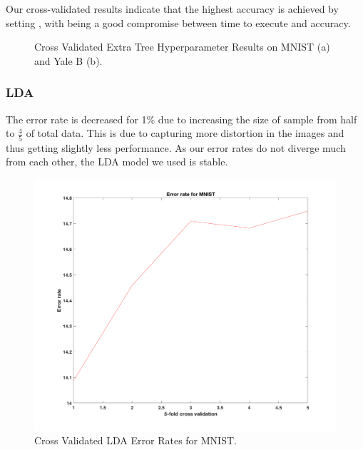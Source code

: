 Our cross-validated results indicate that the highest accuracy is achieved by setting , with  being a good compromise between time to execute and accuracy.
%
\begin{figure}[H]
    \centering
    \caption{Cross Validated Extra Tree Hyperparameter Results on MNIST (a) and Yale B (b).}
\end{figure}

\subsubsection{LDA}
The error rate is decreased for 1\% due to increasing the size of sample from half to $\frac{4}{5}$ of total data. This is due to capturing more distortion in the images and thus getting slightly less performance. As our error rates do not diverge much from each other, the LDA model we used is stable. 
\begin{figure}[H]
	\centering\includegraphics[width=0.6\columnwidth]{../images/cr-err-mnist}
	\caption{Cross Validated LDA Error Rates for MNIST.}
\end{figure}

